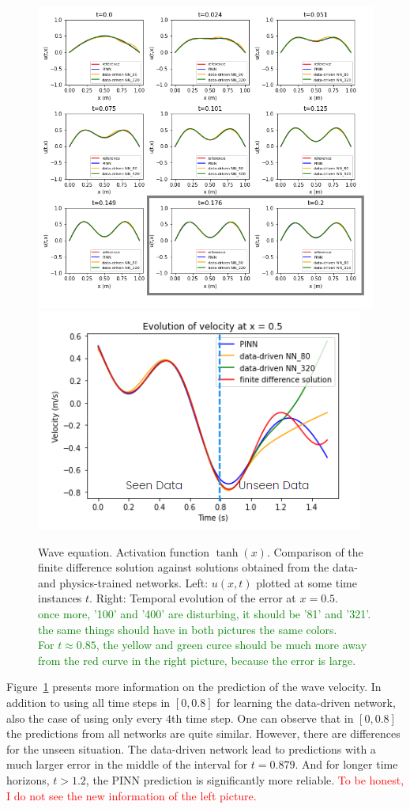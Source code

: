 \begin{figure}[t!]
\begin{center}
\includegraphics[width=0.45\linewidth]{../Code/B1/plots/wave_numerics.png}
\includegraphics[width=0.45\linewidth]{../Code/B1/plots/evolution_plot.png}
\end{center}
\caption{Wave equation. Activation function $\tanh(x)$. Comparison of the finite difference
solution against solutions obtained from the data- and physics-trained networks. 
Left: $u(x,t)$ plotted at some time instances $t$. Right: Temporal evolution of the error
at $x=0.5$.\\
\textcolor{green}{once more, '100' and '400' are disturbing, it should be '81' and '321'.}\\
\textcolor{green}{the same things should have in both pictures the same colors.}\\
\textcolor{green}{For $t\approx 0.85$, the yellow and green curce should be much more away from 
the red curve in the right picture, because the error is large.}}
\label{fig:wave_evolution}
\end{figure}

Figure~\ref{fig:wave_evolution} presents more information on the prediction of the wave velocity. 
In addition to using all time steps in $[0,0.8]$ for learning the data-driven network, also the 
case of using only every $4$th time step. One can observe that in $[0,0.8]$ the predictions 
from all networks are quite similar. However, there are differences for the unseen situation.
The data-driven network lead to predictions with a much larger error in the middle of the interval for $t=0.879$. And for longer time horizons, $t>1.2$, the PINN prediction is significantly more reliable.
\textcolor{red}{To be honest, I do not see the new information of the left picture.}


